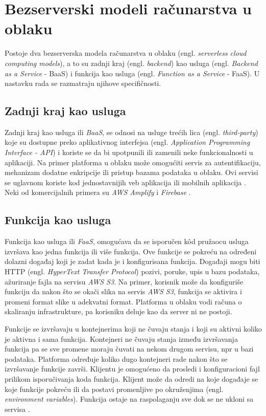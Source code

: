 \documentclass[12pt,oneside]{memoir}
\begin{document}
\section{Bezserverski modeli računarstva u oblaku}
Postoje dva bezserverska modela računarstva u oblaku (engl. \emph{serverless cloud computing models}), a to su zadnji kraj (engl. \emph{backend}) kao usluga (engl. \emph{Backend as a Service} - BaaS) i funkcija kao usluga (engl. \emph{Function as a Service} - FaaS). U nastavku rada se razmatraju njihove specifičnosti.

\subsection{Zadnji kraj kao usluga}

Zadnji kraj kao usluga ili \emph{BaaS}, se odnosi na usluge trećih lica (engl. \emph{third-party}) koje su dostupne preko aplikativnog interfejsa (engl. \emph{Application Programming Interface - API}) i koriste se da bi upotpunili ili zamenili neke funkcionalnosti u aplikaciji. Na primer platforma u oblaku može omogućiti servis za autentifikaciju, mehanizam dodatne enkripcije ili pristup bazama podataka u oblaku. Ovi servisi se uglavnom koriste kod jednostavnijih veb aplikacija ili mobilnih aplikacija \cite{wis, bsa}. Neki od komercijalnih primera su \emph{AWS Amplify} i \emph{Firebase} \cite{baasp}.


\subsection{Funkcija kao usluga}
Funkcija kao usluga ili \emph{FaaS}, omogućava da se isporučen kôd pružaocu usluga izvršava kao jedna funkcija ili više funkcija. Ove funkcije se pokreću na određeni dolazni događaj koji je zadat kada je i konfigurisana funkcija. Događaji mogu biti HTTP (engl. \emph{HyperText Transfer Protocol}) pozivi, poruke, upis u bazu podataka, ažuriranje fajla na servisu \emph{AWS S3}. Na primer, korisnik može da konfiguriše funkciju da nakon što se okači slika na servis \emph{AWS S3}, funkcija se aktivira i promeni format slike u adekvatni format. Platforma u oblaku vodi računa o skaliranju infrastrukture, pa korisniku deluje kao da server ni ne postoji. 

Funkcije se izvršavaju u kontejnerima koji ne čuvaju stanja i koji su aktivni koliko je aktivna i sama funkcija. Kontejneri ne čuvaju stanja između izvršavanja funkcija pa se sve promene moraju čuvati na nekom drugom servisu, npr u bazi podataka. Platforma određuje koliko dugo kontejneri rade nakon što se izvršavanje funkcije završi. Klijentu je omogućeno da prosledi i konfiguracioni fajl prilikom isporučivanja koda funkcija. Klijent može da odredi na koje događaje se koje funkcije pokreću ili da postavi promenljive po okruženjima (engl. \emph{environment variables}). Funkcija ostaje na raspolaganju sve dok se ne ukloni sa servisa \cite{bsa}.
\end{document}
